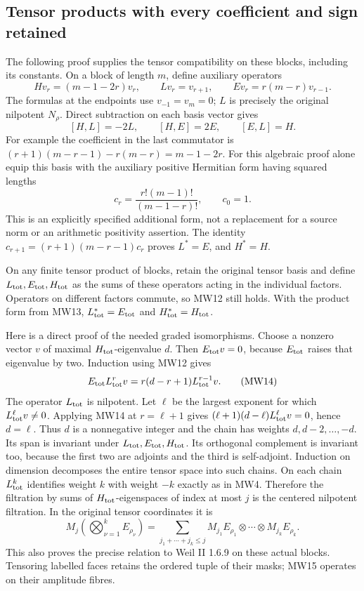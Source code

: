 \subsection{Tensor products with every coefficient and sign retained}

The following proof supplies the tensor compatibility on these blocks,
including its constants. On a block of length \(m\), define auxiliary
operators
\[
 H v_r=(m-1-2r)v_r,\qquad
 L v_r=v_{r+1},\qquad
 E v_r=r(m-r)v_{r-1}.
 \tag{MW11}
\]
The formulas at the endpoints use \(v_{-1}=v_m=0\); \(L\) is precisely
the original nilpotent \(N_\rho\). Direct subtraction on each basis
vector gives
\[
 [H,L]=-2L,\qquad [H,E]=2E,\qquad [E,L]=H .
 \tag{MW12}
\]
For example the coefficient in the last commutator is
\((r+1)(m-r-1)-r(m-r)=m-1-2r\).
For this algebraic proof alone equip this basis with the auxiliary
positive Hermitian form having squared lengths
\[
 c_r=\frac{r!(m-1)!}{(m-1-r)!},\qquad c_0=1 .
 \tag{MW13}
\]
This is an explicitly specified additional form, not a replacement
for a source norm or an arithmetic positivity assertion.
The identity
\(c_{r+1}=(r+1)(m-r-1)c_r\) proves \(L^*=E\), and \(H^*=H\).

On any finite tensor product of blocks, retain the original tensor
basis and define \(L_{\rm tot},E_{\rm tot},H_{\rm tot}\) as the sums
of these operators acting in the individual factors. Operators on
different factors commute, so MW12 still holds. With the product
form from MW13, \(L_{\rm tot}^*=E_{\rm tot}\) and
\(H_{\rm tot}^*=H_{\rm tot}\).

Here is a direct proof of the needed graded isomorphisms.
Choose a nonzero vector \(v\) of maximal \(H_{\rm tot}\)-eigenvalue
\(d\). Then \(E_{\rm tot}v=0\), because \(E_{\rm tot}\) raises that
eigenvalue by two. Induction using MW12 gives
\[
 E_{\rm tot}L_{\rm tot}^r v
       =r(d-r+1)L_{\rm tot}^{r-1}v .
 \tag{MW14}
\]
The operator \(L_{\rm tot}\) is nilpotent. Let \(\ell\) be the
largest exponent for which \(L_{\rm tot}^\ell v\ne0\).
Applying MW14 at \(r=\ell+1\) gives
\((\ell+1)(d-\ell)L_{\rm tot}^\ell v=0\), hence \(d=\ell\).
Thus \(d\) is a nonnegative integer and the chain has weights
\(d,d-2,\ldots,-d\).
Its span is invariant under \(L_{\rm tot},E_{\rm tot},H_{\rm tot}\).
Its orthogonal complement is invariant too, because the first two
are adjoints and the third is self-adjoint. Induction on dimension
decomposes the entire tensor space into such chains.
On each chain \(L_{\rm tot}^k\) identifies weight \(k\) with weight
\(-k\) exactly as in MW4. Therefore the filtration by sums of
\(H_{\rm tot}\)-eigenspaces of index at most \(j\) is the centered
nilpotent filtration. In the original tensor coordinates it is
\[
 M_j\left(\bigotimes_{\nu=1}^k E_{\rho_\nu}\right)
   =\sum_{j_1+\cdots+j_k\leq j}
        M_{j_1}E_{\rho_1}\otimes\cdots\otimes M_{j_k}E_{\rho_k}.
 \tag{MW15}
\]
This also proves the precise relation to Weil II 1.6.9 on these
actual blocks. Tensoring labelled faces retains the ordered tuple
of their masks; MW15 operates on their amplitude fibres.

